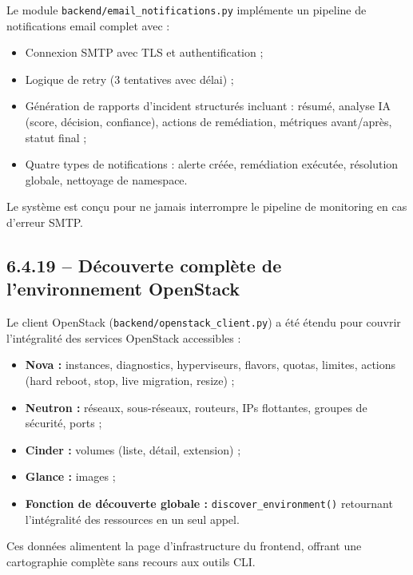 \documentclass[11pt,a4paper]{report}
\begin{document}
Le module \texttt{backend/email\_notifications.py} implémente un pipeline
de notifications email complet avec :

\begin{itemize}[label=\textbullet, leftmargin=1.5cm, labelsep=0.5cm,
                itemsep=0.1em, parsep=0em, topsep=0.2em]
    \item Connexion SMTP avec TLS et authentification ;
    \item Logique de retry (3 tentatives avec délai) ;
    \item Génération de rapports d'incident structurés incluant : résumé,
    analyse IA (score, décision, confiance), actions de remédiation,
    métriques avant/après, statut final ;
    \item Quatre types de notifications : alerte créée, remédiation exécutée,
    résolution globale, nettoyage de namespace.
\end{itemize}

Le système est conçu pour ne jamais interrompre le pipeline de monitoring en
cas d'erreur SMTP.

\subsection*{6.4.19 -- Découverte complète de l'environnement OpenStack}

Le client OpenStack (\texttt{backend/openstack\_client.py}) a été étendu pour
couvrir l'intégralité des services OpenStack accessibles :

\begin{itemize}[label=\textbullet, leftmargin=1.5cm, labelsep=0.5cm,
                itemsep=0.1em, parsep=0em, topsep=0.2em]
    \item \textbf{Nova :} instances, diagnostics, hyperviseurs, flavors,
    quotas, limites, actions (hard reboot, stop, live migration, resize) ;
    \item \textbf{Neutron :} réseaux, sous-réseaux, routeurs, IPs flottantes,
    groupes de sécurité, ports ;
    \item \textbf{Cinder :} volumes (liste, détail, extension) ;
    \item \textbf{Glance :} images ;
    \item \textbf{Fonction de découverte globale :}
    \texttt{discover\_environment()} retournant l'intégralité des ressources
    en un seul appel.
\end{itemize}

Ces données alimentent la page d'infrastructure du frontend, offrant une
cartographie complète sans recours aux outils CLI.
\end{document}
